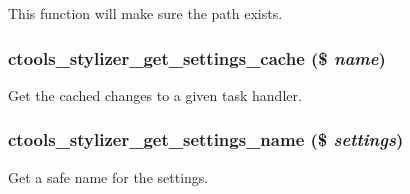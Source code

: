 This function will make sure the path exists. \hypertarget{includes_2stylizer_8inc_a92cca1a6bea307b8086a08909f909d40}{
\subsubsection[{ctools\_\-stylizer\_\-get\_\-settings\_\-cache}]{\setlength{\rightskip}{0pt plus 5cm}ctools\_\-stylizer\_\-get\_\-settings\_\-cache (\$ {\em name})}}
\label{includes_2stylizer_8inc_a92cca1a6bea307b8086a08909f909d40}
Get the cached changes to a given task handler. \hypertarget{includes_2stylizer_8inc_a51b57618f1b4645dc9be0c1156ce0fbc}{
\subsubsection[{ctools\_\-stylizer\_\-get\_\-settings\_\-name}]{\setlength{\rightskip}{0pt plus 5cm}ctools\_\-stylizer\_\-get\_\-settings\_\-name (\$ {\em settings})}}
\label{includes_2stylizer_8inc_a51b57618f1b4645dc9be0c1156ce0fbc}
Get a safe name for the settings.

